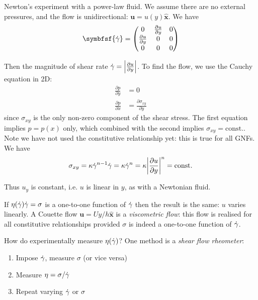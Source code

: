 \documentclass{jknotes}
\begin{document}
\begin{eg}
	Newton's experiment with a power-law fluid. We assume there are no
	external pressures, and the flow is unidirectional: $\symbf{u} =
	u(y)\hat{\symbf{x}}$. We have
	\begin{equation}
		\symbfsf{\srate} = \begin{pmatrix} 0 & \frac{\partial u}{\partial y} &
			0 \\ \frac{\partial  u}{\partial y} & 0 & 0 \\ 0 & 0 & 0
		\end{pmatrix}
	\end{equation}

	Then the magnitude of shear rate $\dot{\gamma} = \abs{\frac{\partial u}{\partial
	y}}$. To find the flow, we use the Cauchy equation in 2D:
	\begin{equation}
		\begin{aligned}
			\frac{\partial p}{\partial y} &= 0 \\
			\frac{\partial p}{\partial x} &= \frac{\partial \sigma_{xy}}{\partial y} 
		\end{aligned}
	\end{equation}
	since $\sigma_{xy}$ is the only non-zero component of the shear stress.
	The first equation implies $p = p(x)$ only, which combined with the second
	implies $\sigma_{xy} = \text{const.}$. Note we have not used the
	constitutive relationship yet: this is true for all GNFs. We have
	\begin{equation}
		\sigma_{xy} = \kappa \dot{\gamma}^{n-1} \dot{\gamma} = \kappa \dot{\gamma}^n = \kappa
		\abs{\frac{\partial u}{\partial y}}^n = \text{const.}
	\end{equation}

	Thus $u_y$ is constant, i.e. $u$ is linear in $y$, as with a Newtonian
	fluid. 
\end{eg}

If $\eta(\dot{\gamma})\dot{\gamma} = \sigma$ is a one-to-one function of $\dot{\gamma}$ then the
result is the same: $u$ varies linearly. A Couette flow $\symbf{u} = Uy/h
\hat{\symbf{x}}$ is a \emph{viscometric flow}: this flow is realised for all
constitutive relationships provided $\sigma$ is indeed a one-to-one function
of $\dot{\gamma}$.

How do experimentally measure $\eta(\dot{\gamma})$? One method is a \emph{shear flow
rheometer}:
\begin{enumerate}
	\item Impose $\dot{\gamma}$, measure $\sigma$ (or vice versa)
	\item Measure $\eta = \sigma/\dot{\gamma}$
	\item Repeat varying $\dot{\gamma}$ or $\sigma$
\end{enumerate}
\end{document}
